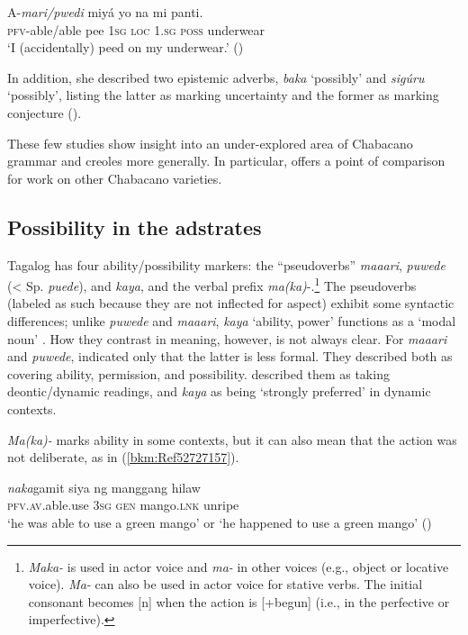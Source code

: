 \documentclass[output=paper,colorlinks,citecolor=brown]{langscibook}
\begin{document}
\ea\label{ex:lesho:2}
\gll A-\textit{mari/pwedi} miyá yo na mi panti.\\
     \textsc{pfv}{}-able/able pee 1\textsc{sg} \textsc{loc} 1.\textsc{sg poss} underwear \\
\glt `I (accidentally) peed on my underwear.' (\citealt[163--164]{Sippola2011})
\z

In addition, she described two epistemic adverbs, \textit{baka} ‘possibly’ and \textit{sigúru} ‘possibly’, listing the latter as marking uncertainty and the former as marking conjecture (\citealt[209--209]{Sippola2011}).

These few studies show insight into an under-explored area of Chabacano grammar and creoles more generally. In particular, \citet{Sippola2011} offers a point of comparison for work on other Chabacano varieties.

\subsection{Possibility in the adstrates}

Tagalog has four ability/possibility markers: the “pseudoverbs” \textit{maaari}, \textit{puwede} (< Sp. \textit{puede}), and \textit{kaya}, and the verbal prefix \textit{ma(ka)}{}-.\footnote{\textit{Maka-} is used in actor voice and \textit{ma-} in other voices (e.g., object or locative voice). \textit{Ma-} can also be used in actor voice for stative verbs. The initial consonant becomes [n] when the action is [+begun] (i.e., in the perfective or imperfective).} The pseudoverbs (labeled as such because they are not inflected for aspect) exhibit some syntactic differences; unlike \textit{puwede} and \textit{maaari}, \textit{kaya} ‘ability, power’ functions as a ‘modal noun’ \citep{Kroeger1993}. How they contrast in meaning, however, is not always clear. For \textit{maaari} and \textit{puwede},  \citet[261]{SchachterOtanes1972} indicated only that the latter is less formal. They described both as covering ability, permission, and possibility. \citet[14--15]{AsarinaHolt2005} described them as taking deontic/dynamic readings, and \textit{kaya} as being ‘strongly preferred’ in dynamic contexts.

\textit{Ma(ka)-} marks ability in some contexts, but it can also mean that the action was not deliberate, as in (\ref{bkm:Ref52727157}).

\ea\label{bkm:Ref52727157}
\gll \textit{naka}gamit siya ng manggang hilaw\\
       \textsc{pfv.av}.able.use 3\textsc{sg} \textsc{gen} mango.\textsc{lnk} unripe \\
\glt       `he was able to use a green mango' or ‘he happened to use a green mango' (\citealt[330]{SchachterOtanes1972})\\
\z
\end{document}
